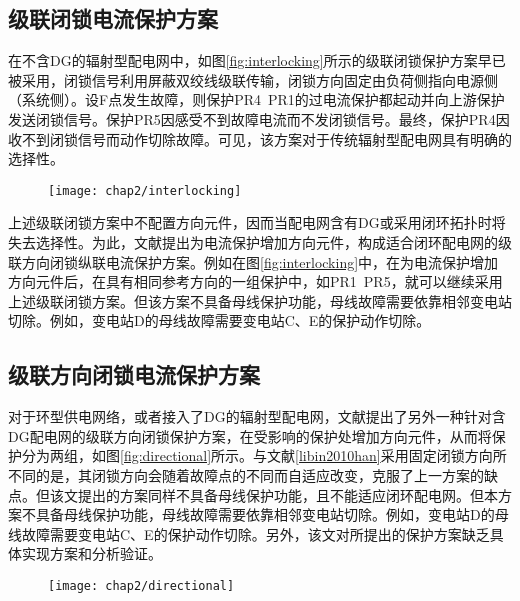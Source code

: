 \subsection{级联闭锁电流保护方案}

在不含DG的辐射型配电网中，如图\ref{fig:interlocking}所示的级联闭锁保护方案早已被采用\cite{yong1990optimizing}，闭锁信号利用屏蔽双绞线级联传输，闭锁方向固定由负荷侧指向电源侧（系统侧）。设F点发生故障，则保护PR4~PR1的过电流保护都起动并向上游保护发送闭锁信号。保护PR5因感受不到故障电流而不发闭锁信号。最终，保护PR4因收不到闭锁信号而动作切除故障。可见，该方案对于传统辐射型配电网具有明确的选择性。

\begin{figure}[!htp]
  \centering
  \texttt{[image: chap2/interlocking]}
\end{figure}

上述级联闭锁方案中不配置方向元件，因而当配电网含有DG或采用闭环拓扑时将失去选择性。为此，文献\cite{libin2010han}提出为电流保护增加方向元件，构成适合闭环配电网的级联方向闭锁纵联电流保护方案。例如在图\ref{fig:interlocking}中，在为电流保护增加方向元件后，在具有相同参考方向的一组保护中，如PR1~PR5，就可以继续采用上述级联闭锁方案。但该方案不具备母线保护功能，母线故障需要依靠相邻变电站切除。例如，变电站D的母线故障需要变电站C、E的保护动作切除。

\subsection{级联方向闭锁电流保护方案}

对于环型供电网络，或者接入了DG的辐射型配电网，文献\cite{oudalov2009adaptive}提出了另外一种针对含DG配电网的级联方向闭锁保护方案，在受影响的保护处增加方向元件，从而将保护分为两组，如图\ref{fig:directional}所示。与文献\ref{libin2010han}采用固定闭锁方向所不同的是，其闭锁方向会随着故障点的不同而自适应改变，克服了上一方案的缺点。但该文提出的方案同样不具备母线保护功能，且不能适应闭环配电网。但本方案不具备母线保护功能，母线故障需要依靠相邻变电站切除。例如，变电站D的母线故障需要变电站C、E的保护动作切除。另外，该文对所提出的保护方案缺乏具体实现方案和分析验证。

\begin{figure}[!htp]
  \centering
  \texttt{[image: chap2/directional]}
\end{figure}

